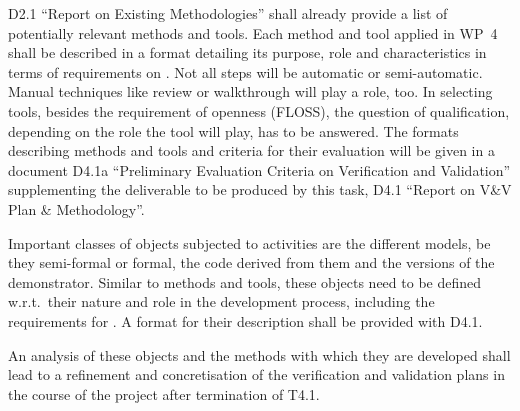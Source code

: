 D2.1 ``Report on Existing Methodologies'' shall already provide a list
of potentially relevant methods and tools. Each method and tool
applied in WP~4 shall be described in a format detailing its purpose,
role and characteristics in terms of requirements on \vv.  Not all
steps will be automatic or semi-automatic. Manual techniques
like review or walkthrough will play a role, too. In selecting tools,
besides the requirement of openness (FLOSS), the question of
qualification, depending on the role the tool will play, has to be
answered. The formats describing methods and tools and criteria for
their evaluation will be given in a document D4.1a ``Preliminary
Evaluation Criteria on Verification and Validation'' supplementing the
deliverable to be produced by this task, D4.1 ``Report on V\&V Plan \&
Methodology''. 

Important classes of objects subjected to \vv activities are the
different models, be they semi-formal or formal, the code derived from
them and the versions of the demonstrator. Similar to methods and
tools, these objects need to be defined w.r.t.\ their nature and role
in the development process, including the requirements for \vv. A
format for their description shall be provided with D4.1.

An analysis of these objects and the methods with which they are
developed shall lead to a refinement and concretisation of the
verification and validation plans in the course of the project after
termination of T4.1.


